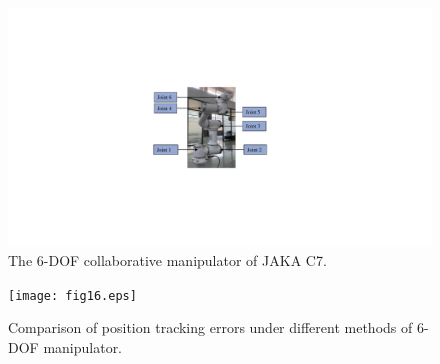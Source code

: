 \documentclass[pdflatex,sn-mathphys-num]{sn-jnl}%
\theoremstyle{thmstyleone}%
\theoremstyle{thmstyletwo}%
\theoremstyle{thmstylethree}%
\begin{document}

\begin{figure}[H]
	\centering
	\includegraphics[width=0.4\linewidth]{fig15.pdf}
	\caption{The 6-DOF collaborative manipulator of JAKA C7.}
	\label{fig:15}
\end{figure}



\begin{figure}[H]
	\centering
	\texttt{[image: fig16.eps]}
	\caption{Comparison of position tracking errors under different methods of 6-DOF manipulator.}
	\label{fig:16}
\end{figure}
\end{document}
